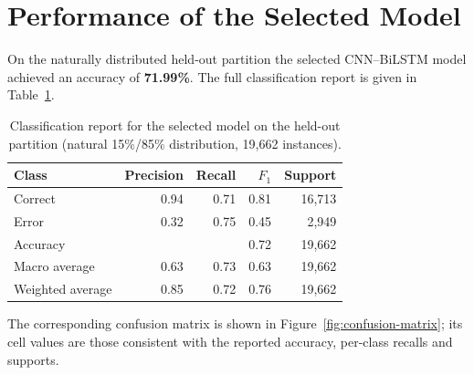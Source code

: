 \section{Performance of the Selected Model}
\label{sec:res-selected}

On the naturally distributed held-out partition the selected CNN--BiLSTM model
achieved an accuracy of \textbf{71.99\%}. The full classification report is
given in Table~\ref{tab:classification-report}.

\begin{table}[H]
\centering
\caption[Classification report on the held-out partition]{Classification report
for the selected model on the held-out partition (natural 15\%/85\%
distribution, 19{,}662 instances).}
\label{tab:classification-report}
\begin{tabular}{@{}lrrrr@{}}
\toprule
\textbf{Class} & \textbf{Precision} & \textbf{Recall} & \textbf{$F_1$} & \textbf{Support} \\
\midrule
Correct        & 0.94 & 0.71 & 0.81 & 16{,}713 \\
Error          & 0.32 & 0.75 & 0.45 & 2{,}949 \\
\midrule
Accuracy       &      &      & 0.72 & 19{,}662 \\
Macro average  & 0.63 & 0.73 & 0.63 & 19{,}662 \\
Weighted average & 0.85 & 0.72 & 0.76 & 19{,}662 \\
\bottomrule
\end{tabular}
\end{table}

The corresponding confusion matrix is shown in
Figure~\ref{fig:confusion-matrix}; its cell values are those consistent with the
reported accuracy, per-class recalls and supports.

